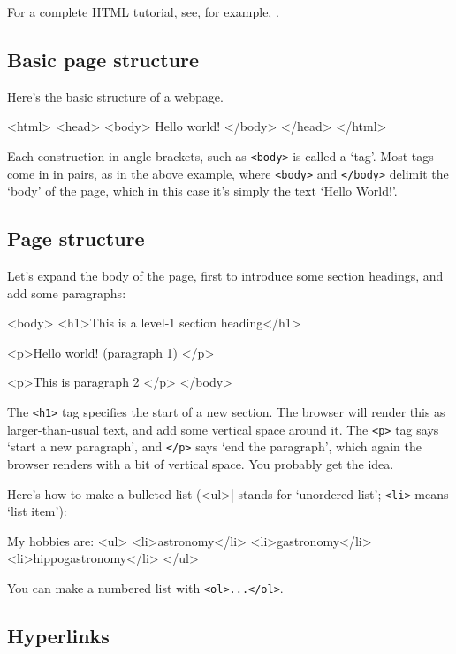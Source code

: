 For a complete HTML tutorial, see, for example,
.

\subsection{Basic page structure}

Here's the basic structure of a webpage.

\begin{ttoutenv}
<html>
<head>
<body>
Hello world!
</body>
</head>
</html>
\end{ttoutenv}

Each construction in angle-brackets, such as \verb|<body>| is called a
`tag'. Most tags come in in pairs, as in the above example, where
\verb|<body>| and \verb|</body>| delimit the `body' of the page, which
in this case it's simply the text `Hello World!'.

\subsection{Page structure}

Let's expand the body of the page, first to introduce some section
headings, and add some paragraphs:

\begin{ttoutenv}
<body>
<h1>This is a level-1 section heading</h1>

<p>Hello world! (paragraph 1) </p>

<p>This is paragraph 2 </p>
</body>
\end{ttoutenv}

The \verb|<h1>| tag specifies the start of a new section. The browser
will render this as larger-than-usual text, and add some vertical
space around it. The \verb|<p>| tag says `start a new paragraph', and
\verb|</p>| says `end the paragraph', which again the browser renders
with a bit of vertical space. You probably get the idea.

Here's how to make a bulleted list (\verb||<ul>| stands for `unordered
list'; \verb|<li>| means `list item'):

\begin{ttoutenv}
My hobbies are:
<ul>
<li>astronomy</li>
<li>gastronomy</li>
<li>hippogastronomy</li>
</ul>
\end{ttoutenv}

You can make a numbered list with \verb|<ol>...</ol>|.

\subsection{Hyperlinks}


